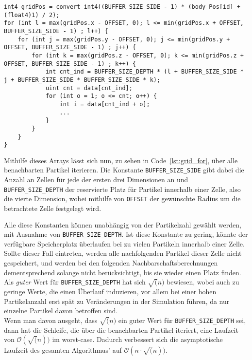\begin{minipage}{\linewidth}
\begin{lstlisting}[caption=Iteration über benachbarte Partikel, label=lst:grid_for]
int4 gridPos = convert_int4((BUFFER_SIZE_SIDE - 1) * (body_Pos[id] + (float4)1) / 2);
for (int l = max(gridPos.x - OFFSET, 0); l <= min(gridPos.x + OFFSET, BUFFER_SIZE_SIDE - 1) ; l++) {
	for (int j = max(gridPos.y - OFFSET, 0); j <= min(gridPos.y + OFFSET, BUFFER_SIZE_SIDE - 1) ; j++) {
		for (int k = max(gridPos.z - OFFSET, 0); k <= min(gridPos.z + OFFSET, BUFFER_SIZE_SIDE - 1) ; k++) {
			int cnt_ind = BUFFER_SIZE_DEPTH * (l + BUFFER_SIZE_SIDE * j + BUFFER_SIZE_SIDE * BUFFER_SIZE_SIDE * k);
			uint cnt = data[cnt_ind];			
			for (int o = 1; o <= cnt; o++) {
				int i = data[cnt_ind + o];
				...
			}
		}
	}
}
\end{lstlisting}
\end{minipage}

Mithilfe dieses Arrays lässt sich nun, zu sehen in Code~\ref{lst:grid_for}, über alle benachbarten Partikel iterieren. Die Konstante \texttt{BUFFER\_SIZE\_SIDE} gibt dabei die Anzahl an Zellen für jede der ersten drei Dimensionen an und \texttt{BUFFER\_SIZE\_DEPTH} der reservierte Platz für Partikel innerhalb einer Zelle, also die vierte Dimension, wobei mithilfe von \texttt{OFFSET} der gewünschte Radius um die betrachtete Zelle festgelegt wird.


Alle diese Konstanten können unabhängig von der Partikelzahl gewählt werden, mit Ausnahme von \texttt{BUFFER\_SIZE\_DEPTH}. Ist diese Konstante zu gering, könnte der verfügbare Speicherplatz überlaufen bei zu vielen Partikeln innerhalb einer Zelle. Sollte dieser Fall eintreten, werden alle nachfolgenden Partikel dieser Zelle nicht gespeichert, und werden bei den folgenden Nachbarschaftsberechnungen dementsprechend solange nicht berücksichtigt, bis sie wieder einen Platz finden.\\
Als \textit{guter} Wert für \texttt{BUFFER\_SIZE\_DEPTH} hat sich $\sqrt(n)$ bewiesen, wobei auch zu geringe Werte, die einen Überlauf induzieren, vor allem bei einer hohen Partikelanzahl erst spät zu Veränderungen in der Simulation führen, da nur einzelne Partikel davon betroffen sind.\\
Wenn man davon ausgeht, dass $\sqrt(n)$ ein guter Wert für \texttt{BUFFER\_SIZE\_DEPTH} sei, dann hat die Schleife, die über die benachbarten Partikel iteriert, eine Laufzeit von $\mathcal O(\sqrt(n))$ im worst-case. Dadurch verbessert sich die asymptotische Laufzeit des gesamten Algorithmus' auf $\mathcal O(n \cdot \sqrt(n))$.
